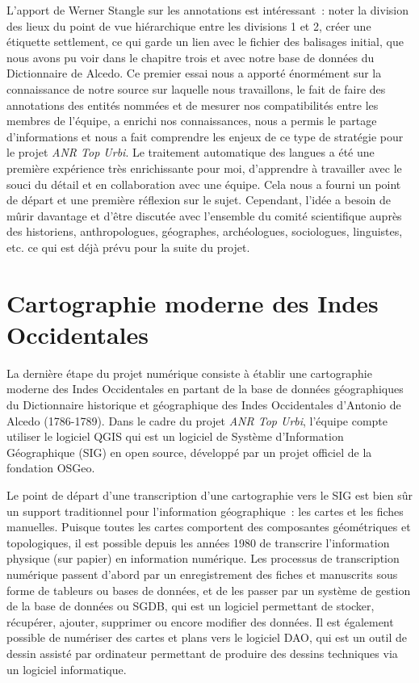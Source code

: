\documentclass[a4paper,12pt,twoside]{book}
\begin{document}
L’apport de Werner Stangle sur les annotations est intéressant : noter la division des lieux du point de vue hiérarchique entre les divisions 1 et 2, créer une étiquette settlement, ce qui garde un lien avec le fichier des balisages initial, que nous avons pu voir dans le chapitre trois et avec notre base de données du Dictionnaire de Alcedo. Ce premier essai nous a apporté énormément sur la connaissance de notre source sur laquelle nous travaillons, le fait de faire des annotations des entités nommées et de mesurer nos compatibilités entre les membres de l’équipe, a enrichi nos connaissances, nous a permis le partage d’informations et nous a fait comprendre les enjeux de ce type de stratégie pour le projet \textit{ANR Top Urbi}. Le traitement automatique des langues a été une première expérience très enrichissante pour moi, d’apprendre à travailler avec le souci du détail et en collaboration avec une équipe. Cela nous a fourni un point de départ et une première réflexion sur le sujet. Cependant, l’idée a besoin de mûrir davantage et d’être discutée avec l’ensemble du comité scientifique auprès des historiens, anthropologues, géographes, archéologues, sociologues, linguistes, etc. ce qui est déjà prévu pour la suite du projet.

\section{Cartographie moderne des Indes Occidentales}

La dernière étape du projet numérique consiste à établir une cartographie moderne des Indes Occidentales en partant de la base de données géographiques du Dictionnaire historique et géographique des Indes Occidentales d’Antonio de Alcedo (1786-1789). Dans le cadre du projet \textit{ANR Top Urbi}, l’équipe compte utiliser le logiciel QGIS qui est un logiciel de Système d’Information Géographique (SIG) en open source, développé par un projet officiel de la fondation \Gls{OSGeo}.

Le point de départ d’une transcription d’une cartographie vers le SIG est bien sûr un support traditionnel pour l’information géographique : les cartes et les fiches manuelles. Puisque toutes les cartes comportent des composantes géométriques et topologiques, il est possible depuis les années 1980 de transcrire l’information physique (sur papier) en information numérique. Les processus de transcription numérique passent d’abord par un enregistrement des fiches et manuscrits sous forme de tableurs ou bases de données, et de les passer par un système de gestion de la base de données ou SGDB, qui est un logiciel permettant de stocker, récupérer, ajouter, supprimer ou encore modifier des données. Il est également possible de numériser des cartes et plans vers le logiciel DAO, qui est un outil de dessin assisté par ordinateur permettant de produire des dessins techniques via un logiciel informatique. 
\end{document}
